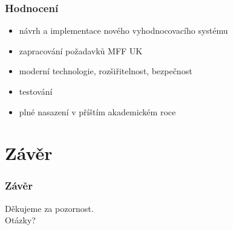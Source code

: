 \documentclass{beamer}
\begin{document}
\begin{frame}
	\frametitle{Hodnocení}
	\begin{itemize}
		\item návrh a implementace nového vyhodnocovacího systému
		\item zapracování požadavků MFF UK
		\item moderní technologie, rozšiřitelnost, bezpečnost
		\item testování
		\item plné nasazení v příštím akademickém roce
	\end{itemize}
\end{frame}

\section{Závěr}
\begin{frame}
	\frametitle{Závěr}
	\centering
	Děkujeme za pozornost.\\
	\LARGE{Otázky?}
\end{frame}
\end{document}
